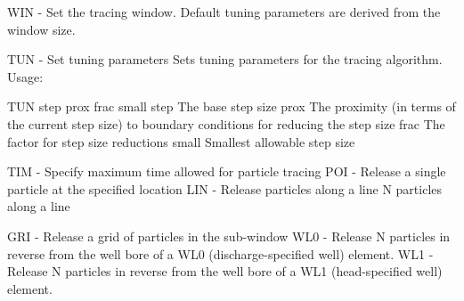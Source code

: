 WIN - Set the tracing window. Default tuning parameters are derived
from the window size.

TUN - Set tuning parameters Sets tuning parameters for the tracing
algorithm. Usage:

TUN step prox frac small step The base step size prox The proximity
(in terms of the current step size) to boundary conditions for reducing
the step size frac The factor for step size reductions small Smallest
allowable step size

TIM - Specify maximum time allowed for particle tracing POI - Release
a single particle at the specified location LIN - Release particles
along a line N particles along a line

GRI - Release a grid of particles in the sub-window WL0 - Release
N particles in reverse from the well bore of a WL0 (discharge-specified
well) element. WL1 - Release N particles in reverse from the well
bore of a WL1 (head-specified well) element.
